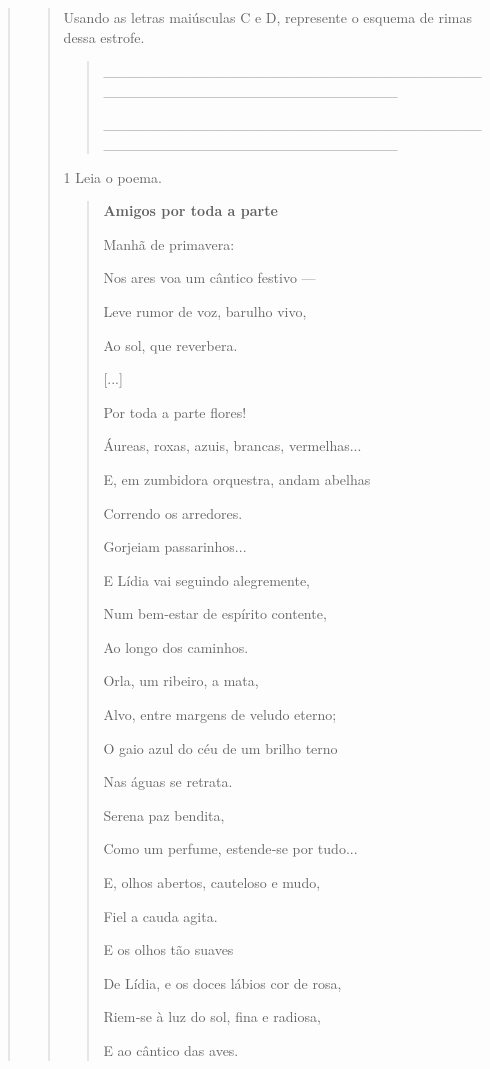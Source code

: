 \begin{boxlist}
{{\begin{quote}
\begin{quote}
Usando as letras maiúsculas C e D, represente o esquema de rimas dessa estrofe.


\begin{quote}
\_\_\_\_\_\_\_\_\_\_\_\_\_\_\_\_\_\_\_\_\_\_\_\_\_\_\_\_\_\_\_\_\_\_\_\_\_\_\_\_\_\_\_\_\_\_\_\_\_\_\_\_\_\_\_\_\_\_\_\_\_\_\_\_

\_\_\_\_\_\_\_\_\_\_\_\_\_\_\_\_\_\_\_\_\_\_\_\_\_\_\_\_\_\_\_\_\_\_\_\_\_\_\_\_\_\_\_\_\_\_\_\_\_\_\_\_\_\_\_\_\_\_\_\_\_\_\_\_
\end{quote}


\num{1} Leia o poema.

\begin{quote}
\textbf{Amigos por toda a parte}

Manhã de primavera:

Nos ares voa um cântico festivo ---

Leve rumor de voz, barulho vivo,

Ao sol, que reverbera.


{[}...{]}


Por toda a parte flores!

Áureas, roxas, azuis, brancas, vermelhas...

E, em zumbidora orquestra, andam abelhas

Correndo os arredores.


Gorjeiam passarinhos...

E Lídia vai seguindo alegremente,

Num bem‑estar de espírito contente,

Ao longo dos caminhos.


Orla, um ribeiro, a mata,

Alvo, entre margens de veludo eterno;

O gaio azul do céu de um brilho terno

Nas águas se retrata.


Serena paz bendita,

Como um perfume, estende‑se por tudo...

E, olhos abertos, cauteloso e mudo,

Fiel a cauda agita.


E os olhos tão suaves

De Lídia, e os doces lábios cor de rosa,

Riem‑se à luz do sol, fina e radiosa,

E ao cântico das aves.


\end{quote}
\end{quote}
\end{quote}}}
\end{boxlist}
